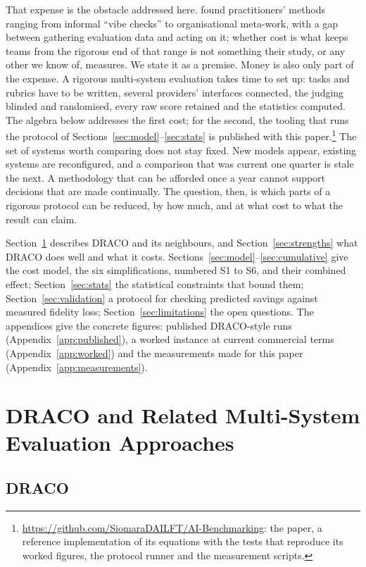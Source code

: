 \documentclass[11pt]{article}
\newcommand{\sectionbreak}{\par\ifdim\pagetotal<5.5\baselineskip\relax\else\clearpage\fi}
\begin{document}
That expense is the obstacle addressed here.  found practitioners' methods ranging from informal ``vibe checks'' to organisational meta-work, with a gap between gathering evaluation data and acting on it; whether cost is what keeps teams from the rigorous end of that range is not something their study, or any other we know of, measures. We state it as a premise. Money is also only part of the expense. A rigorous multi-system evaluation takes time to set up: tasks and rubrics have to be written, several providers' interfaces connected, the judging blinded and randomised, every raw score retained and the statistics computed. The algebra below addresses the first cost; for the second, the tooling that runs the protocol of Sections~\ref{sec:model}--\ref{sec:stats} is published with this paper.\footnote{\url{https://github.com/SiomaraDAILFT/AI-Benchmarking}: the paper, a reference implementation of its equations with the tests that reproduce its worked figures, the protocol runner and the measurement scripts.} The set of systems worth comparing does not stay fixed. New models appear, existing systems are reconfigured, and a comparison that was current one quarter is stale the next. A methodology that can be afforded once a year cannot support decisions that are made continually. The question, then, is which parts of a rigorous protocol can be reduced, by how much, and at what cost to what the result can claim.

Section~\ref{sec:draco} describes DRACO and its neighbours, and Section~\ref{sec:strengths} what DRACO does well and what it costs. Sections~\ref{sec:model}--\ref{sec:cumulative} give the cost model, the six simplifications, numbered S1 to S6, and their combined effect; Section~\ref{sec:stats} the statistical constraints that bound them; Section~\ref{sec:validation} a protocol for checking predicted savings against measured fidelity loss; Section~\ref{sec:limitations} the open questions. The appendices give the concrete figures: published DRACO-style runs (Appendix~\ref{app:published}), a worked instance at current commercial terms (Appendix~\ref{app:worked}) and the measurements made for this paper (Appendix~\ref{app:measurements}).

\sectionbreak
\section{DRACO and Related Multi-System Evaluation Approaches}
\label{sec:draco}

\subsection{DRACO}
\end{document}
